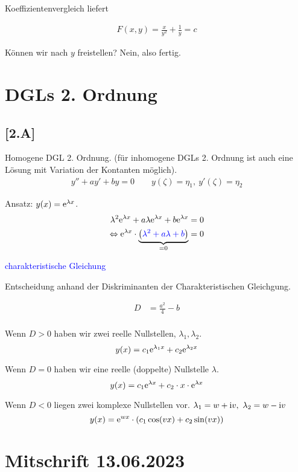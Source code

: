 \documentclass[main.tex]{subfiles}
\begin{document}
Koeffizientenvergleich liefert

\begin{align*}
	F(x,y) = \frac{x}{y^2} + \frac{1}{y} = c
\end{align*}

Können wir nach $y$ freistellen? Nein, also fertig. 

\section{DGLs 2. Ordnung}

\subsection*{[2.A]}

Homogene DGL 2. Ordnung. (für inhomogene DGLs 2. Ordnung ist auch eine Lösung mit Variation der Kontanten möglich).
\begin{align*}
	y'' + a y' + by = 0 \qquad y(\zeta) = \eta_1,\ y'(\zeta) = \eta_2
\end{align*}

Ansatz: $y(x) = \mathrm{e}^{\lambda x}$. 
\begin{align*}
	\lambda^2 \mathrm{e}^{\lambda x} + a\lambda \mathrm{e}^{\lambda x} + b\mathrm{e}^{\lambda x} = 0 \\
	\Leftrightarrow \mathrm{e}^{\lambda x} \cdot \underbrace{\left( \textcolor{blue}{\lambda^2 +a\lambda + b} \right)}_{= 0} = 0
\end{align*}

\textcolor{blue}{charakteristische Gleichung}

Entscheidung anhand der Diskriminanten der Charakteristischen Gleichgung.

\begin{align}
	D &= \frac{a^2}{4} -b \\
\end{align}

Wenn $D > 0$ haben wir zwei reelle Nullstellen, $\lambda_1, \lambda_2$.
$$
	y(x) = c_1 \mathrm{e}^{\lambda_1 x} + c_2 \mathrm{e}^{\lambda_2 x} 
$$

Wenn $D = 0$ haben wir eine reelle (doppelte) Nullstelle $\lambda$.
$$
	y(x) = c_1 \mathrm{e}^{\lambda x} + c_2 \cdot x \cdot \mathrm{e}^{\lambda x} 
$$

Wenn $D < 0$ liegen zwei komplexe Nullstellen vor. $\lambda_1 = w + \mathrm{i}v,\ \lambda_2 = w - \mathrm{i}v$
$$
	y(x) = \mathrm{e}^{w x} \cdot \left( c_1 \cos(v x) + c_2 \sin(v x) \right) 
$$

\section{Mitschrift 13.06.2023}
\end{document}
